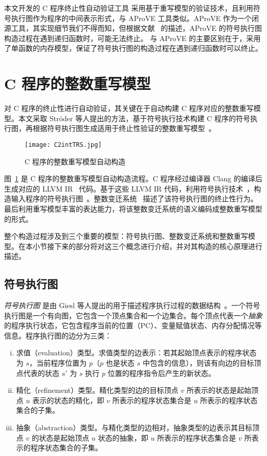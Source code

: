 本文开发的 C 程序终止性自动验证工具 \CTerm 采用基于重写模型的验证技术，且利用符号执行图作为程序的中间表示形式，与 AProVE 工具类似。AProVE 作为一个闭源工具，其实现细节我们不得而知，但根据文献~ 的描述，AProVE 的符号执行图构造过程在遇到递归函数时，可能无法终止。 \CTerm 与 AProVE 的主要区别在于，\CTerm 采用了单函数的内存模型，保证了符号执行图的构造过程在遇到递归函数时可以终止。


\section{C 程序的整数重写模型}
\label{s:termination-models}

对 C 程序的终止性进行自动验证，其关键在于自动构建 C 程序对应的整数重写模型。本文采取 Str\"oder 等人提出的方法，基于符号执行技术构建 C 程序的符号执行图，再根据符号执行图生成适用于终止性验证的整数重写模型~\cite{DBLP:journals/jar/StroderGBFFHSA17}。

\begin{figure}[ht]
\centering
\texttt{[image: C2intTRS.jpg]}
\caption{C 程序的整数重写模型自动构造}
\label{f:C2intTRS}
\end{figure}

图~\ref{f:C2intTRS} 是 C 程序的整数重写模型自动构造流程。C 程序经过编译器 Clang 的编译后生成对应的 LLVM IR~\cite{DBLP:conf/cgo/LattnerA04} 代码。基于这些 LLVM IR 代码，利用符号执行技术~\cite{DBLP:journals/cacm/King76}，构造输入程序的符号执行图~\cite{DBLP:conf/lopstr/GieslSSEF12}。整数变迁系统~\cite{DBLP:journals/cacm/Keller76} 描述了该符号执行图的终止性行为。最后利用重写模型丰富的表达能力，将该整数变迁系统的语义编码成整数重写模型的形式。

整个构造过程涉及到三个重要的模型：符号执行图、整数变迁系统和整数重写模型。在本小节接下来的部分将对这三个概念进行介绍，并对其构造的核心原理进行描述。

\subsection{符号执行图}
\label{ss:seg}

\emph{符号执行图} 是由 Giesl 等人提出的用于描述程序执行过程的数据结构~\cite{DBLP:conf/lopstr/GieslSSEF12}。一个符号执行图是一个有向图，它包含一个顶点集合和一个边集合。每个顶点代表一个\emph{抽象} 的程序执行状态，它包含程序当前的位置（PC）、变量赋值状态、内存分配情况等信息。程序执行图的边分为三类：
\begin{enumerate} [(i)]
\item 求值（evaluation）类型。求值类型的边表示：若其起始顶点表示的程序状态为 $s$，当前程序位置为 $p$（$p$ 也是状态 $s$ 中包含的信息），则该有向边的目标顶点代表的状态 $s'$ 为 $s$ 执行 $p$ 位置的程序指令后产生的新状态。
\item 精化（refinement）类型。精化类型的边的目标顶点 $v$ 所表示的状态是起始顶点 $u$ 表示的状态的精化，即 $v$ 所表示的程序状态集合是 $u$ 所表示的程序状态集合的子集。
\item 抽象（abstraction）类型。与精化类型的边相对，抽象类型的边表示其目标顶点 $v$ 的状态是起始顶点 $u$ 状态的抽象，即 $u$ 所表示的程序状态集合是 $v$ 所表示的程序状态集合的子集。
\end{enumerate}

